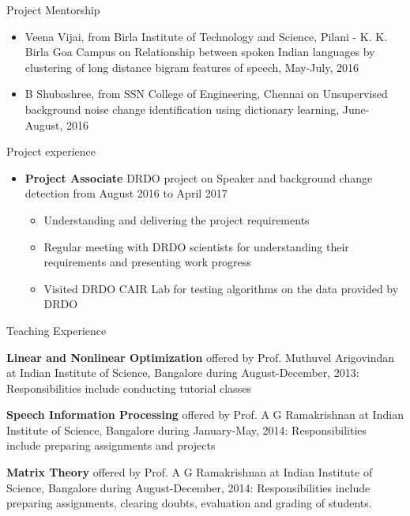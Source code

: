 \documentclass[10pt]{article}
\begin{document}
\begin{cv}
\begin{cvlist}{Project Mentorship}
\begin{itemize}
\item Veena Vijai, from Birla Institute of Technology and Science, Pilani - K. K. Birla Goa Campus  on Relationship between spoken Indian languages by clustering of long distance bigram features of speech, May-July, 2016

\item B Shubashree, from SSN College of Engineering, Chennai on Unsupervised background noise change identification using dictionary learning, June- August, 2016
\end{itemize}

\end{cvlist}

\begin{cvlist}{Project experience}
	\item
\begin{itemize}
	\item \textbf{Project Associate} DRDO project on Speaker and background change detection from August 2016 to April 2017
	\begin{itemize}
		\item Understanding and delivering the project requirements
		\item Regular meeting with DRDO scientists for understanding their requirements and  presenting work progress
		\item Visited DRDO CAIR Lab for testing algorithms on the data provided by DRDO 
	\end{itemize}
\end{itemize}	
\end{cvlist}


\begin{cvlist}{Teaching Experience}

\item 
 \textbf{Linear and Nonlinear Optimization} offered  by Prof. Muthuvel Arigovindan at  Indian Institute of Science, Bangalore during 
 August-December, 2013: Responsibilities include conducting tutorial classes  
\item
 \textbf{Speech Information Processing}  offered  by Prof. A G Ramakrishnan at  Indian Institute of Science, Bangalore during 
  January-May, 2014: Responsibilities include   preparing assignments and projects
  \item
   \textbf{Matrix Theory}  offered  by Prof. A G Ramakrishnan at  Indian Institute of Science, Bangalore during 
    August-December, 2014: Responsibilities include   preparing assignments, clearing doubts, evaluation and grading of students.
      


\end{cvlist}
\end{cv}
\end{document}
